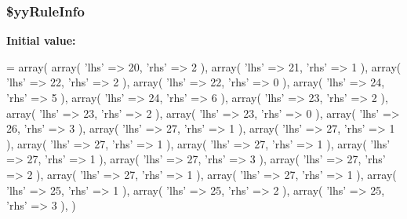 \subsubsection[{\$yy\+Rule\+Info}]{\setlength{\rightskip}{0pt plus 5cm}\$yy\+Rule\+Info\hspace{0.3cm}{\ttfamily [static]}}\label{class_smarty___internal___configfileparser_a1b2c73431788fbe1e01f52637b23b32d}
{\bfseries Initial value\+:}
\begin{DoxyCode}
= array(
  array( \textcolor{stringliteral}{'lhs'} => 20, \textcolor{stringliteral}{'rhs'} => 2 ),
  array( \textcolor{stringliteral}{'lhs'} => 21, \textcolor{stringliteral}{'rhs'} => 1 ),
  array( \textcolor{stringliteral}{'lhs'} => 22, \textcolor{stringliteral}{'rhs'} => 2 ),
  array( \textcolor{stringliteral}{'lhs'} => 22, \textcolor{stringliteral}{'rhs'} => 0 ),
  array( \textcolor{stringliteral}{'lhs'} => 24, \textcolor{stringliteral}{'rhs'} => 5 ),
  array( \textcolor{stringliteral}{'lhs'} => 24, \textcolor{stringliteral}{'rhs'} => 6 ),
  array( \textcolor{stringliteral}{'lhs'} => 23, \textcolor{stringliteral}{'rhs'} => 2 ),
  array( \textcolor{stringliteral}{'lhs'} => 23, \textcolor{stringliteral}{'rhs'} => 2 ),
  array( \textcolor{stringliteral}{'lhs'} => 23, \textcolor{stringliteral}{'rhs'} => 0 ),
  array( \textcolor{stringliteral}{'lhs'} => 26, \textcolor{stringliteral}{'rhs'} => 3 ),
  array( \textcolor{stringliteral}{'lhs'} => 27, \textcolor{stringliteral}{'rhs'} => 1 ),
  array( \textcolor{stringliteral}{'lhs'} => 27, \textcolor{stringliteral}{'rhs'} => 1 ),
  array( \textcolor{stringliteral}{'lhs'} => 27, \textcolor{stringliteral}{'rhs'} => 1 ),
  array( \textcolor{stringliteral}{'lhs'} => 27, \textcolor{stringliteral}{'rhs'} => 1 ),
  array( \textcolor{stringliteral}{'lhs'} => 27, \textcolor{stringliteral}{'rhs'} => 1 ),
  array( \textcolor{stringliteral}{'lhs'} => 27, \textcolor{stringliteral}{'rhs'} => 3 ),
  array( \textcolor{stringliteral}{'lhs'} => 27, \textcolor{stringliteral}{'rhs'} => 2 ),
  array( \textcolor{stringliteral}{'lhs'} => 27, \textcolor{stringliteral}{'rhs'} => 1 ),
  array( \textcolor{stringliteral}{'lhs'} => 27, \textcolor{stringliteral}{'rhs'} => 1 ),
  array( \textcolor{stringliteral}{'lhs'} => 25, \textcolor{stringliteral}{'rhs'} => 1 ),
  array( \textcolor{stringliteral}{'lhs'} => 25, \textcolor{stringliteral}{'rhs'} => 2 ),
  array( \textcolor{stringliteral}{'lhs'} => 25, \textcolor{stringliteral}{'rhs'} => 3 ),
    )
\end{DoxyCode}
\hypertarget{class_smarty___internal___configfileparser_a38c2a9898ce64b9714635acfbfc291d7}{}
